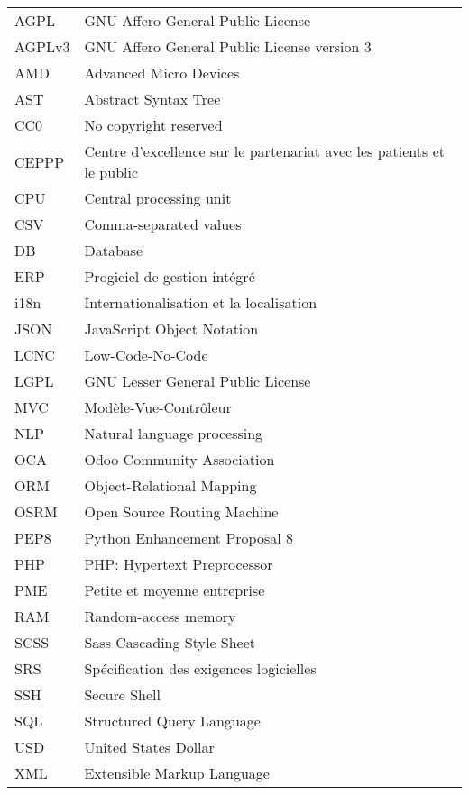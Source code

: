 \chapter*{\abbrevname}
\pagestyle{pagenumber}
%
\begin{acronym}
\end{acronym}
%
\begin{longtable}{lp{5in}}
AGPL      & GNU Affero General Public License\\
AGPLv3    & GNU Affero General Public License version 3\\
AMD       & Advanced Micro Devices\\
AST       & Abstract Syntax Tree\\
CC0       & No copyright reserved\\
CEPPP     & Centre d'excellence sur le partenariat avec les patients et le public\\
CPU       & Central processing unit\\
CSV       & Comma-separated values\\
DB        & Database\\
ERP       & Progiciel de gestion intégré\\
i18n      & Internationalisation et la localisation\\
JSON      & JavaScript Object Notation\\
LCNC      & Low-Code-No-Code\\
LGPL      & GNU Lesser General Public License\\
MVC       & Modèle-Vue-Contrôleur\\
NLP       & Natural language processing\\
OCA       & Odoo Community Association\\
ORM       & Object-Relational Mapping\\
OSRM      & Open Source Routing Machine\\
PEP8      & Python Enhancement Proposal 8\\
PHP       & PHP: Hypertext Preprocessor\\
PME       & Petite et moyenne entreprise\\
RAM       & Random-access memory\\
SCSS      & Sass Cascading Style Sheet\\
SRS       & Spécification des exigences logicielles\\
SSH       & Secure Shell\\
SQL       & Structured Query Language\\
USD       & United States Dollar\\
XML       & Extensible Markup Language\\

\end{longtable}
